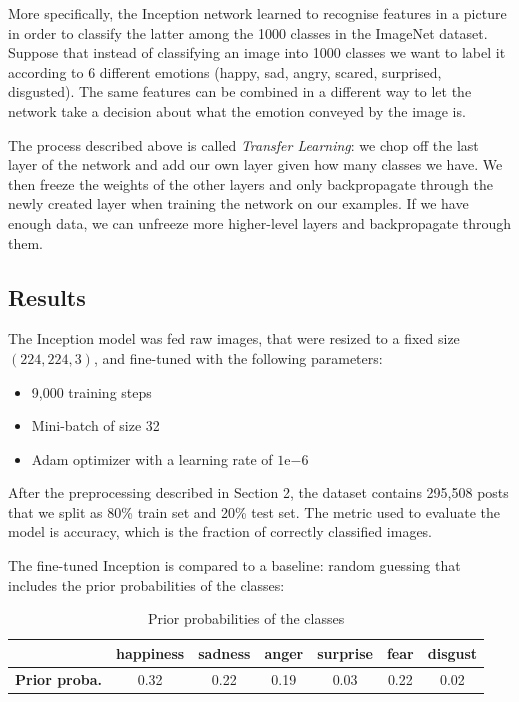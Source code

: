 \documentclass{article} %
\begin{document}
More specifically, the Inception network learned to recognise features in a picture in order to classify the latter among the 1000 classes in the ImageNet dataset. Suppose that instead of classifying an image into 1000 classes we want to label it according to 6 different emotions (happy, sad, angry, scared, surprised, disgusted). The same features can be combined in a different way to let the network take a decision about what the emotion conveyed by the image is.

The process described above is called {\em Transfer Learning}: we chop off the last layer of the network and add our own layer given how many classes we have. We then freeze the weights of the other layers and only backpropagate through the newly created layer when training the network on our examples. If we have enough data, we can unfreeze more higher-level layers and backpropagate through them.

\subsection{Results}
The Inception model was fed raw images, that were resized to a fixed size $(224, 224, 3)$, and fine-tuned with the following parameters:
\begin{itemize}[topsep=0pt]
    \item 9,000 training steps
    \item Mini-batch of size 32
    \item Adam optimizer with a learning rate of $1\mathrm{e}{-6}$
\end{itemize}

After the preprocessing described in Section 2, the dataset contains 295,508 posts that we split as 80\% train set and 20\% test set. The metric used to evaluate the model is accuracy, which is the fraction of correctly classified images.

The fine-tuned Inception is compared to a baseline: random guessing that includes the prior probabilities of the classes: 
\begin{table}[H]
\caption{Prior probabilities of the classes}
\begin{center}
    \begin{tabular}{| c | c | c | c | c | c | c |}
    \hline
     & \textbf{happiness} & \textbf{sadness} &  \textbf{anger} & \textbf{surprise} & \textbf{fear} & \textbf{disgust} \\ \hline
    \textbf{Prior proba.} & 0.32 & 0.22 & 0.19 & 0.03 & 0.22 & 0.02 \\
    \hline
    \end{tabular}
\end{center} 
\end{table}
\end{document}
